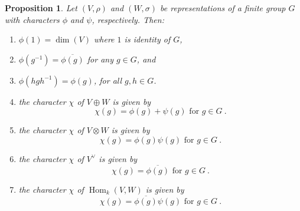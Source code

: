 \documentclass[12pt]{article}
\theoremstyle{plain}
\newtheorem{proposition}[theorem]{Proposition}
\theoremstyle{definition}
\theoremstyle{remark}
\numberwithin{equation}{section}
\begin{document}
\begin{proposition}
Let $(V,\rho)$ and $(W,\sigma)$ be representations of a finite group
$G$ with characters $\phi$ and $\psi$, respectively.
Then:
\begin{enumerate}
\item $\phi(1)=\dim(V)$ where $1$ is identity of $G$,
\item $\phi(g^{-1}) = \overline{\phi(g)}$
for any $g \in G$, and
\item $\phi(hgh^{-1})=\phi(g)$, for all $g,h \in G$.
\item
the character $\chi$ of $V \oplus W$ is given by
\[
\chi(g) = \phi(g) + \psi(g) \textrm{ for } g \in G \ .
\]
\item
the character $\chi$ of $V \otimes W$ is given by
\[
\chi(g) = \phi(g) \psi(g) \textrm{ for } g \in G \ .
\]
\item
the character $\chi$ of $V^\vee$ is given by
\[
\chi(g) = \overline{\phi(g)} \textrm{ for } g \in G \ .
\]
\item
the character $\chi$ of $\operatorname{Hom}_k(V,W)$ is given by
\[
\chi(g) = \overline{\phi(g)} \psi(g) \textrm{ for } g \in G \ .
\]
\end{enumerate}
\end{proposition}
\end{document}
